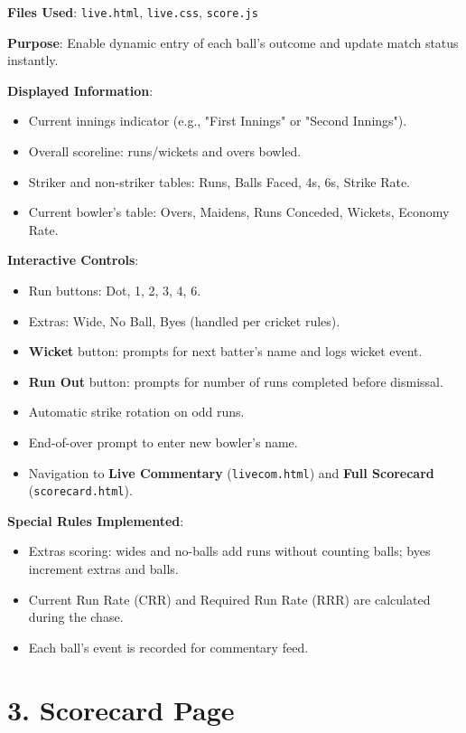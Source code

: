 \documentclass[a4paper,12pt]{article}
\begin{document}
\textbf{Files Used}: \texttt{live.html}, \texttt{live.css}, \texttt{score.js}

\textbf{Purpose}: Enable dynamic entry of each ball's outcome and update match status instantly.

\textbf{Displayed Information}:
\begin{itemize}
  \item Current innings indicator (e.g., "First Innings" or "Second Innings").
  \item Overall scoreline: runs/wickets and overs bowled.
  \item Striker and non-striker tables: Runs, Balls Faced, 4s, 6s, Strike Rate.
  \item Current bowler's table: Overs, Maidens, Runs Conceded, Wickets, Economy Rate.
\end{itemize}

\textbf{Interactive Controls}:
\begin{itemize}
  \item Run buttons: Dot, 1, 2, 3, 4, 6.
  \item Extras: Wide, No Ball, Byes (handled per cricket rules).
  \item \textbf{Wicket} button: prompts for next batter's name and logs wicket event.
  \item \textbf{Run Out} button: prompts for number of runs completed before dismissal.
  \item Automatic strike rotation on odd runs.
  \item End-of-over prompt to enter new bowler's name.
  \item Navigation to \textbf{Live Commentary} (\texttt{livecom.html}) and \textbf{Full Scorecard} (\texttt{scorecard.html}).
\end{itemize}

\textbf{Special Rules Implemented}:
\begin{itemize}
  \item Extras scoring: wides and no-balls add runs without counting balls; byes increment extras and balls.
  \item Current Run Rate (CRR) and Required Run Rate (RRR) are calculated during the chase.
  \item Each ball's event is recorded for commentary feed.
\end{itemize}

\vspace{0.5cm}

\section*{3. Scorecard Page}
\end{document}
